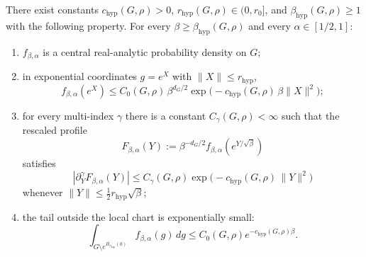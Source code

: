\begin{lemma}\label{lem:A1_low_regime_hypotheses}
There exist constants $c_{\mathrm{hyp}}(G,\rho)>0$, $r_{\mathrm{hyp}}(G,\rho)\in(0,r_0]$, and $\beta_{\mathrm{hyp}}(G,\rho)\ge 1$ with the following property.
For every $\beta\ge \beta_{\mathrm{hyp}}(G,\rho)$ and every $\alpha\in[1/2,1]$:
\begin{enumerate}[label=\textup{(\roman*)}]
\item $f_{\beta,\alpha}$ is a central real-analytic probability density on $G$;
\item in exponential coordinates $g=e^X$ with $\|X\|\le r_{\mathrm{hyp}}$,
\begin{equation}\label{eq:A1_low_local_gaussian_bound}
f_{\beta,\alpha}(e^X)
\le
C_0(G,\rho)\,\beta^{d_G/2}
\exp\!\bigl(-c_{\mathrm{hyp}}(G,\rho)\,\beta\|X\|^2\bigr);
\end{equation}
\item for every multi-index $\gamma$ there is a constant $C_\gamma(G,\rho)<\infty$ such that the rescaled profile
\[
F_{\beta,\alpha}(Y):=\beta^{-d_G/2}f_{\beta,\alpha}(e^{Y/\sqrt{\beta}})
\]
satisfies
\begin{equation}\label{eq:A1_low_rescaled_derivative_bound}
|\partial_Y^\gamma F_{\beta,\alpha}(Y)|
\le
C_\gamma(G,\rho)
\exp\!\bigl(-c_{\mathrm{hyp}}(G,\rho)\,\|Y\|^2\bigr)
\end{equation}
whenever $\|Y\|\le \frac12 r_{\mathrm{hyp}}\sqrt{\beta}$;
\item the tail outside the local chart is exponentially small:
\begin{equation}\label{eq:A1_low_tail_bound}
\int_{G\setminus e^{B_{r_{\mathrm{hyp}}}(0)}} f_{\beta,\alpha}(g)\,dg
\le
C_0(G,\rho)e^{-c_{\mathrm{hyp}}(G,\rho)\beta}.
\end{equation}
\end{enumerate}
\end{lemma}

